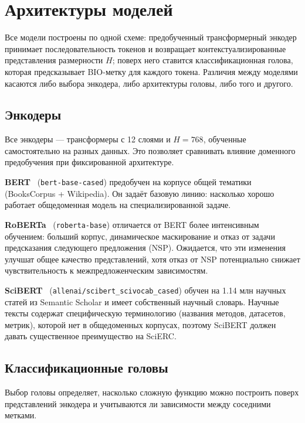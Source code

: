 \section{Архитектуры моделей}

Все модели построены по одной схеме: предобученный трансформерный энкодер принимает последовательность токенов и возвращает контекстуализированные представления размерности $H$; поверх него ставится классификационная голова, которая предсказывает BIO-метку для каждого токена. Различия между моделями касаются либо выбора энкодера, либо архитектуры головы, либо того и другого.

\subsection{Энкодеры}

Все энкодеры --- трансформеры с 12 слоями и $H = 768$, обученные самостоятельно на разных данных. Это позволяет сравнивать влияние доменного предобучения при фиксированной архитектуре.

\textbf{BERT}~\cite{devlin2019bert} (\texttt{bert-base-cased}) предобучен на корпусе общей тематики (BooksCorpus + Wikipedia). Он задаёт базовую линию: насколько хорошо работает общедоменная модель на специализированной задаче.

\textbf{RoBERTa}~\cite{liu2019roberta} (\texttt{roberta-base}) отличается от BERT более интенсивным обучением: больший корпус, динамическое маскирование и отказ от задачи предсказания следующего предложения (NSP). Ожидается, что эти изменения улучшат общее качество представлений, хотя отказ от NSP потенциально снижает чувствительность к межпредложенческим зависимостям.

\textbf{SciBERT}~\cite{beltagy2019scibert} (\texttt{allenai/scibert\_scivocab\_cased}) обучен на 1.14 млн научных статей из Semantic Scholar и имеет собственный научный словарь. Научные тексты содержат специфическую терминологию (названия методов, датасетов, метрик), которой нет в общедоменных корпусах, поэтому SciBERT должен давать существенное преимущество на SciERC.

\subsection{Классификационные головы}

Выбор головы определяет, насколько сложную функцию можно построить поверх представлений энкодера и учитываются ли зависимости между соседними метками.

